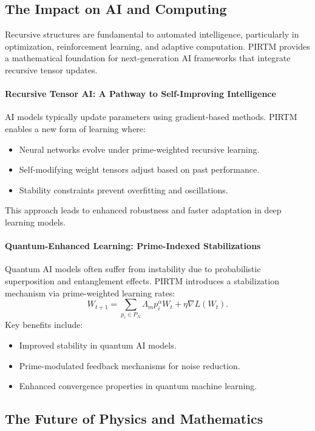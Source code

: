 \documentclass{article}
\theoremstyle{plain}
\begin{document}
\subsection{The Impact on AI and Computing}

Recursive structures are fundamental to automated intelligence, particularly in optimization, reinforcement learning, and adaptive computation. PIRTM provides a mathematical foundation for next-generation AI frameworks that integrate recursive tensor updates.

\paragraph{Recursive Tensor AI: A Pathway to Self-Improving Intelligence}
AI models typically update parameters using gradient-based methods. PIRTM enables a new form of learning where:
\begin{itemize}
    \item Neural networks evolve under prime-weighted recursive learning.
    \item Self-modifying weight tensors adjust based on past performance.
    \item Stability constraints prevent overfitting and oscillations.
\end{itemize}
This approach leads to enhanced robustness and faster adaptation in deep learning models.

\paragraph{Quantum-Enhanced Learning: Prime-Indexed Stabilizations}
Quantum AI models often suffer from instability due to probabilistic superposition and entanglement effects. PIRTM introduces a stabilization mechanism via prime-weighted learning rates:
\begin{equation}
    W_{t+1} = \sum_{p_i \in P_N} \Lambda_m p_i^\alpha W_t + \eta \nabla L(W_t).
\end{equation}
Key benefits include:
\begin{itemize}
    \item Improved stability in quantum AI models.
    \item Prime-modulated feedback mechanisms for noise reduction.
    \item Enhanced convergence properties in quantum machine learning.
\end{itemize}

\subsection{The Future of Physics and Mathematics}
\end{document}
